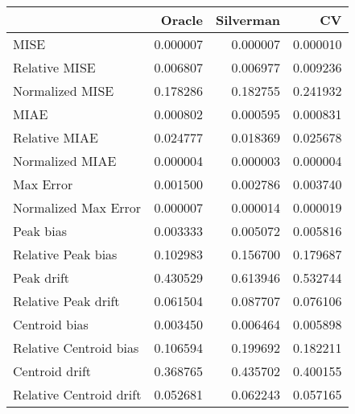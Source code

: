 \begin{tabular}{lrrr}
  \hline
 & Oracle & Silverman & CV \\ 
  \hline
MISE & 0.000007 & 0.000007 & 0.000010 \\ 
  Relative MISE & 0.006807 & 0.006977 & 0.009236 \\ 
  Normalized MISE & 0.178286 & 0.182755 & 0.241932 \\ 
  MIAE & 0.000802 & 0.000595 & 0.000831 \\ 
  Relative MIAE & 0.024777 & 0.018369 & 0.025678 \\ 
  Normalized MIAE & 0.000004 & 0.000003 & 0.000004 \\ 
  Max Error & 0.001500 & 0.002786 & 0.003740 \\ 
  Normalized Max Error & 0.000007 & 0.000014 & 0.000019 \\ 
  Peak bias & 0.003333 & 0.005072 & 0.005816 \\ 
  Relative Peak bias & 0.102983 & 0.156700 & 0.179687 \\ 
  Peak drift & 0.430529 & 0.613946 & 0.532744 \\ 
  Relative Peak drift & 0.061504 & 0.087707 & 0.076106 \\ 
  Centroid bias & 0.003450 & 0.006464 & 0.005898 \\ 
  Relative Centroid bias & 0.106594 & 0.199692 & 0.182211 \\ 
  Centroid drift & 0.368765 & 0.435702 & 0.400155 \\ 
  Relative Centroid drift & 0.052681 & 0.062243 & 0.057165 \\ 
   \hline
\end{tabular}
